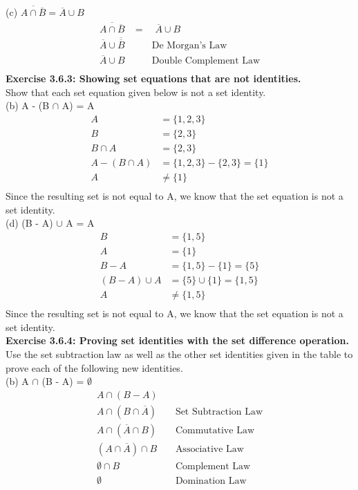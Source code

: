 \documentclass[12pt, letterpaper, twoside]{article}
\begin{document}
(c) $\overline{A \cap \overline{B}} = \overline{A} \cup B$\\
\begin{align*}
\overline{A \cap \overline{B}} &= \quad \overline{A} \cup B\\
\overline{A} \cup \overline{\overline{B}} & \qquad \text{De Morgan's Law}\\
\overline{A} \cup B & \qquad \text{Double Complement Law}\\
\end{align*}
\textbf{Exercise 3.6.3: Showing set equations that are not identities.}\\
Show that each set equation given below is not a set identity.\\
\break
(b) A - (B $\cap$ A) = A\\
\begin{align*}
A &= \{1, 2, 3\}\\
B &= \{2, 3\}\\
B \cap A &= \{2, 3\}\\
A - (B \cap A) &= \{1, 2, 3\} - \{2,3\} = \{1\}\\
A &\neq \{1\}\\
\end{align*}
Since the resulting set is not equal to A, we know that the set equation is not a set identity.\\
\newpage
(d) (B - A) $\cup$ A = A\\
\begin{align*}
B &= \{1, 5\}\\
A &= \{1\}\\
B - A &= \{1, 5\} - \{1\} = \{5\}\\
(B - A) \cup A &= \{5\} \cup \{1\} = \{1, 5\}\\
A &\neq \{1, 5\}\\
\end{align*}
Since the resulting set is not equal to A, we know that the set equation is not a set identity.\\
\break
\textbf{Exercise 3.6.4: Proving set identities with the set difference operation.}\\
Use the set subtraction law as well as the other set identities given in the table to prove each of the following new identities.\\
\break
(b) A $\cap$ (B - A) = $\emptyset$\\
\begin{align*}
A \cap (B - A) &\\
A \cap (B \cap \overline{A}) & \quad \text{Set Subtraction Law}\\
A \cap (\overline{A} \cap B) & \quad \text{Commutative Law}\\
(A \cap \overline{A}) \cap B & \quad \text{Associative Law}\\
\emptyset \cap B & \quad \text{Complement Law}\\
\emptyset & \quad \text{Domination Law}\\
\end{align*}
\end{document}
